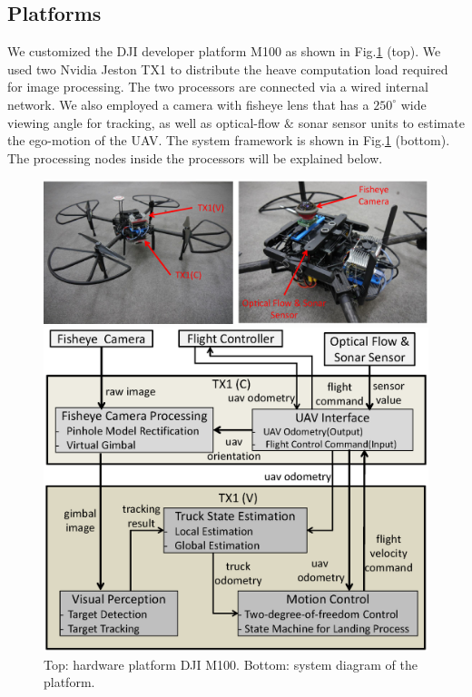 \documentclass{standalone}
\begin{document}
\subsection{Platforms}
We customized the DJI developer platform M100 as shown in Fig.\ref{figure:task1-platform} (top). We used two Nvidia Jeston TX1 to distribute the heave computation load required for image processing. The two processors are connected via a wired internal network.
We also employed a camera with fisheye lens that has a $250^\circ$ wide viewing angle for tracking, as well as optical-flow $\&$ sonar sensor units to estimate the ego-motion of the UAV. The system framework is shown in Fig.\ref{figure:task1-platform} (bottom). The processing nodes inside the processors will be explained below.

\begin{figure}[h]
    \begin{center}
        \begin{minipage}{\hsize}
          \begin{center}
      \includegraphics[clip, bb= 0 0 700 260, width=\columnwidth]{sections/task1/images/task1_hardware.eps}
          \end{center}
        \end{minipage}
        \begin{minipage}{1.0\hsize}
          \begin{center}
      \includegraphics[clip, bb= 0 0 525 440, width=0.9\columnwidth]{sections/task1/images/task1_framework.eps}
          \end{center}
        \end{minipage}
    \end{center}
    \caption{Top: hardware platform DJI M100. Bottom: system diagram of the platform.}
    \label{figure:task1-platform}
\end{figure}
\end{document}
